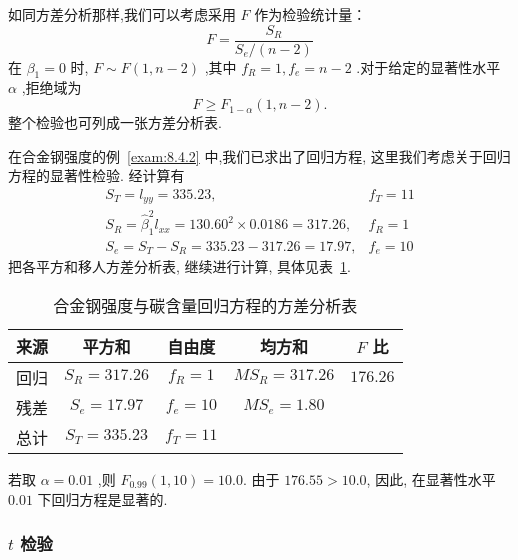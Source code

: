 如同方差分析那样,我们可以考虑采用 $F$ 作为检验统计量：
\begin{equation*}
F=\frac{S_{R}}{S_{e} /(n-2)}
\end{equation*}
在 $\beta_1=0$ 时, $F\sim F(1,n-2)$ ,其中 $f_R=1,f_e=n-2$ .对于给定的显著性水平 $\alpha$ ,拒绝域为
\begin{equation*} F\ge F_{1-\alpha}(1,n-2).  \end{equation*}
整个检验也可列成一张方差分析表.
\begin{example}\label{exam:8.4.3}
在合金钢强度的例~\ref{exam:8.4.2} 中,我们已求出了回归方程, 这里我们考虑关于回归方程的显著性检验. 经计算有
\begin{equation*}
\begin{array}{ll}
{S_{T}=l_{y y}=335.23,} & {f_{T}=11} \\
{S_{R}=\hat{\beta}_{1}^{2} l_{x x}=130.60^{2} \times 0.0186=317.26,} & {f_{R}=1} \\ {S_{e}=S_{T}-S_{R}=335.23-317.26=17.97,} & {f_{e}=10}
\end{array}
\end{equation*}
把各平方和移人方差分析表, 继续进行计算, 具体见表~\ref{tab:8.4.3}.
\begin{table}[htbp]
  \centering
  \caption{合金钢强度与碳含量回归方程的方差分析表}
  \begin{tabular}{ccccc}
      \toprule
      来源    &  平方和  & 自由度   & 均方和   & $ F$ 比 \\\midrule %
      回归    &  $S_R=317.26$  & $ f_R=1$   &  $MS_R=317.26$  &  $176.26$  \\
      残差    &  $S_e=17.97$  &  $f_e=10$  &  $MS_e=1.80$  &  \\\midrule
      总计    &  $S_T=335.23$  &  $f_T=11$  &       &  \\\bottomrule
  \end{tabular}%
  \label{tab:8.4.3}%
\end{table}%
若取 $\alpha=0.01$ ,则 $F_{0.99}(1,10)=10.0$. 由于 $176.55>10.0$, 因此, 在显著性水平 $0.01$ 下回归方程是显著的.
\end{example}

\subsubsection{$t$ 检验}


